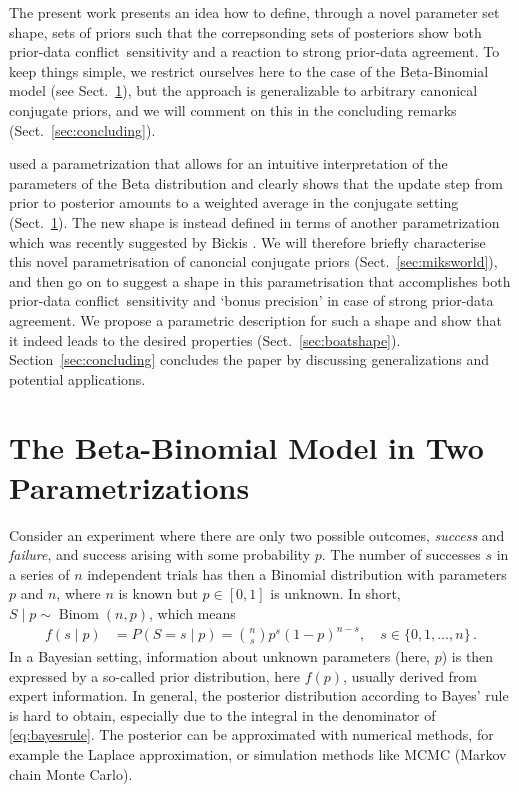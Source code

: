 \documentclass[runningheads,a4paper]{llncs}
\def\pdc{prior-data conflict}
\newcommand{\bin}{\operatorname{Binom}} %
\begin{document}
The present work presents an idea how to define, through a novel parameter set shape,
sets of priors such that the correpsonding sets of posteriors
show both \pdc\ sensitivity and a reaction to strong prior-data agreement.
To keep things simple, we restrict ourselves here to the case of the Beta-Binomial model (see Sect.~\ref{sec:beta-binom}),
but the approach is generalizable to arbitrary canonical conjugate priors,
and we will comment on this in the concluding remarks (Sect.~\ref{sec:concluding}).

\cite{Walter2009a} used a parametrization 
that allows for an intuitive interpretation of the parameters of the Beta distribution
and clearly shows that the update step from prior to posterior
amounts to a weighted average in the conjugate setting (Sect.~\ref{sec:beta-binom}).
The new shape is instead defined in terms of another parametrization
which was recently suggested by Bickis \cite{2015:mik-isipta}.
We will therefore briefly characterise this novel parametrisation of canoncial conjugate priors (Sect.~\ref{sec:miksworld}),
and then go on to suggest a shape in this parametrisation that accomplishes
both \pdc\ sensitivity and `bonus precision' in case of strong prior-data agreement.
We propose a parametric description for such a shape
and show that it indeed leads to the desired properties (Sect.~\ref{sec:boatshape}).
Section~\ref{sec:concluding} concludes the paper by discussing generalizations and potential applications. 


\section{The Beta-Binomial Model in Two Parametrizations}
\label{sec:beta-binom}

Consider an experiment where there are only two possible outcomes,
\emph{success} and \emph{failure}, and success arising with some probability $p$.
The number of successes $s$ in a series of $n$ independent trials
has then a Binomial distribution with parameters $p$ and $n$,
where $n$ is known but $p \in [0,1]$ is unknown.
In short, $S\mid p \sim \bin(n,p)$, which means
\begin{align}
f(s\mid p) &= P(S = s \mid p) = {n \choose s} p^s (1-p)^{n-s},\quad s \in \{0, 1, \ldots, n\}\,.
\label{eq:binompmf}
\end{align}
In a Bayesian setting, information about unknown parameters (here, $p$) is then expressed
by a so-called prior distribution, here $f(p)$, usually derived from expert information.
In general, the posterior distribution according to Bayes' rule is hard to obtain,
especially due to the integral in the denominator of \eqref{eq:bayesrule}.
The posterior can be approximated with numerical methods,
for example the Laplace approximation, or simulation methods like MCMC (Markov chain Monte Carlo).
\end{document}
